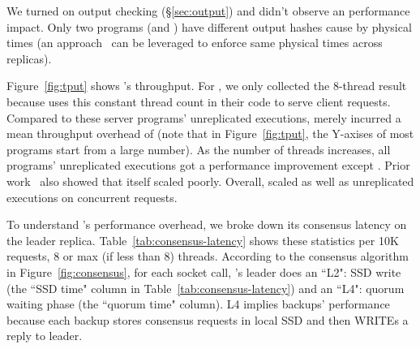 We turned on output checking (\S\ref{sec:output}) and didn't 
observe an performance impact. Only two programs (\mysql and \openldap) 
have different output hashes cause by physical times 
(an approach~\cite{paxos:practical} can be leveraged to enforce same physical 
times across replicas).

Figure~\ref{fig:tput} shows \xxx's throughput. For \calvin, we only collected 
the 8-thread result because \calvin uses this constant thread count in their 
code to serve client requests. Compared to these server programs' 
unreplicated executions, \xxx merely incurred a mean throughput overhead of 
\tputoverhead (note that in Figure~\ref{fig:tput}, the Y-axises of most 
programs start from a large number). As the number of threads increases, all 
programs' unreplicated executions got a performance improvement except 
\memcached. Prior work~\cite{rex:eurosys14} also showed that
\memcached itself scaled poorly. Overall, \xxx scaled as well as unreplicated 
executions on concurrent requests.


To understand \xxx's performance overhead, we broke down its consensus latency 
on the leader replica. Table~\ref{tab:consensus-latency} shows these statistics 
per 10K requests, 8 or max (if less than 8) threads. According to the consensus 
algorithm in Figure~\ref{fig:consensus}, for each socket call, \xxx's leader 
does an ``L2": SSD write (the ``SSD time" column in 
Table~\ref{tab:consensus-latency}) and an ``L4": quorum waiting phase (the 
``quorum time" column). L4 implies backups' performance because each backup 
stores consensus requests in local SSD and then WRITEs a reply to leader.


